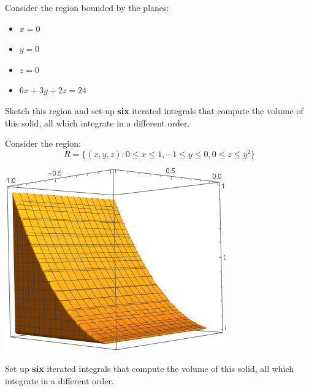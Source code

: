 \documentclass[handout,nooutcomes,noauthor]{ximera}
\begin{document}
\begin{problem}
  Consider the region bounded by the planes:
  \begin{itemize}
  \item $x=0$
  \item $y=0$
  \item $z=0$
  \item $6x+3y+2z = 24$
  \end{itemize}
  Sketch this region and set-up \textbf{six} iterated integrals that
  compute the volume of this solid, all which integrate in a different
  order.
\end{problem}


\begin{problem}
  Consider the region:
  \[
  R=\{(x,y,z): 0 \le x \le 1, -1\le y \le 0, 0\le z\le y^2\}
  \]
  \begin{image}[2in]
    \includegraphics{threeRegion2.png}
  \end{image}
  Set up \textbf{six} iterated integrals that compute the volume of this solid,
  all which integrate in a different order.
\end{problem}
\end{document}
